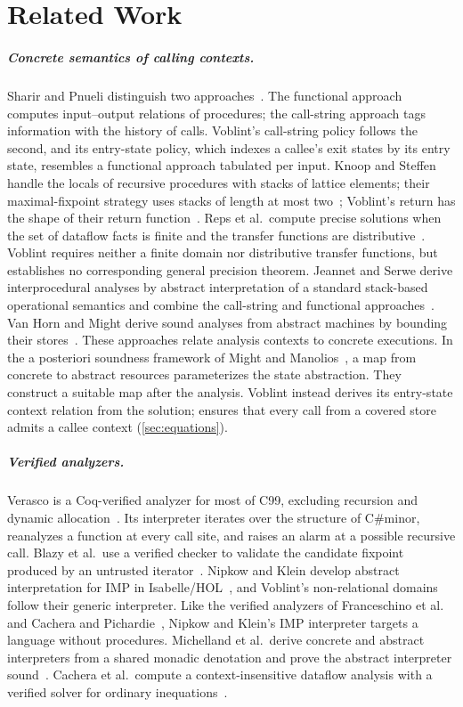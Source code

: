 \section{Related Work}
\label{sec:related}

\subparagraph*{Concrete semantics of calling contexts.}
Sharir and Pnueli distinguish two approaches~\cite{sharir81}. The functional
approach computes input--output relations of procedures; the call-string
approach tags information with the history of calls.
Voblint's call-string policy follows the second, and its entry-state policy,
which indexes a callee's exit states by its entry state, resembles a
functional approach tabulated per input. Knoop and Steffen handle the locals of recursive procedures with
stacks of lattice elements; their maximal-fixpoint strategy uses stacks of
length at most two~\cite{knoop92}; Voblint's return has the shape of their return
function~\cite[§4.1]{knoop92}. Reps et al.\ compute precise solutions when
the set of dataflow facts is finite and the transfer functions are
distributive~\cite{reps95}. Voblint requires neither a finite domain nor
distributive transfer functions, but establishes no corresponding general
precision theorem. Jeannet and Serwe derive interprocedural analyses by abstract
interpretation of a standard stack-based operational semantics and combine the
call-string and functional approaches~\cite{jeannet04}. Van Horn and Might
derive sound analyses from abstract machines by bounding their
stores~\cite{vanhorn10}. These approaches relate analysis contexts to concrete
executions. In the a posteriori soundness framework of Might and
Manolios~\cite{might09}, a map from concrete to abstract resources
parameterizes the state abstraction. They construct a suitable map after
the analysis.
Voblint instead derives its entry-state context relation from the solution;
 ensures that every call from a covered store admits a callee context
(\cref{sec:equations}).

\subparagraph*{Verified analyzers.}
Verasco is a Coq-verified analyzer for most of C99, excluding recursion and
dynamic allocation~\cite{jourdan15}. Its interpreter iterates over the
structure of C\#minor, reanalyzes a function at every call site, and raises an
alarm at a possible recursive call. Blazy et al.\ use a verified checker to
validate the candidate fixpoint produced by an untrusted
iterator~\cite{blazy13}. Nipkow and Klein develop
abstract interpretation for IMP in Isabelle/HOL~\cite{nipkow12,nipkow14}, and
Voblint's non-relational domains follow their generic interpreter. Like the
verified analyzers of Franceschino et al.~\cite{franceschino21} and Cachera and
Pichardie~\cite{cachera10}, Nipkow and Klein's IMP interpreter targets a language without procedures.
Michelland et al.\ derive concrete and abstract interpreters from a shared
monadic denotation and prove the abstract interpreter sound~\cite{michelland24}. Cachera
et al.\ compute a context-insensitive dataflow analysis with a verified solver
for ordinary inequations~\cite{cachera05}.

